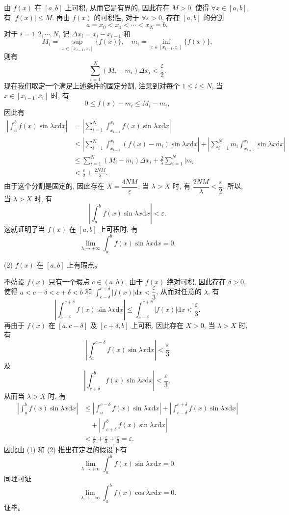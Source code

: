 \documentclass[UTF8, 12pt, fontset=fandol, oneside]{ctexart}
\begin{document}
由 $f(x)$ 在 $[a,b]$ 上可积, 从而它是有界的, 因此存在 $M>0$, 使得 $\forall x\in[a,b]$, 有 $|f(x)|\leqslant M$. 再由 $f(x)$ 的可积性, 对于 $\forall\varepsilon>0$, 存在 $[a,b]$ 的分割
\[
  a=x_0<x_1<\cdots<x_N=b,
\]
对于 $i=1,2,\cdots,N$, 记 $\Delta x_i=x_i-x_{i-1}$ 和
\[
  M_i=\sup_{x\in[x_{i-1},x_i]}\{f(x)\},\quad
  m_i=\inf_{x\in[x_{i-1},x_i]}\{f(x)\},
\]
则有
\[
  \sum_{i=1}^N(M_i-m_i)\Delta x_i<\frac{\varepsilon}{2}.
\]
现在我们取定一个满足上述条件的固定分割, 注意到对每个 $1\leqslant i\leqslant N$, 当 $x\in[x_{i-1},x_i]$ 时, 有
\[
  0\leqslant f(x)-m_i\leqslant M_i-m_i,
\]
因此有
\[
\begin{aligned}
  \left|\int_a^b f(x)\sin\lambda x\mathrm dx\right|
  &=\left|\sum_{i=1}^N\int_{x_{i-1}}^{x_i}f(x)\sin\lambda x\mathrm dx\right|\\
  &\leqslant\left|\sum_{i=1}^N\int_{x_{i-1}}^{x_i}(f(x)-m_i)\sin\lambda x\mathrm dx\right|
    +\left|\sum_{i=1}^N m_i\int_{x_{i-1}}^{x_i}\sin\lambda x\mathrm dx\right|\\
  &\leqslant\sum_{i=1}^N(M_i-m_i)\Delta x_i+\frac2\lambda\sum_{i=1}^N|m_i|\\
  &<\frac{\varepsilon}{2}+\frac{2NM}{\lambda}.
\end{aligned}
\]
由于这个分割是固定的, 因此存在 $X=\dfrac{4NM}{\varepsilon}$, 当 $\lambda>X$ 时, 有 $\dfrac{2NM}{\lambda}<\dfrac{\varepsilon}{2}$. 所以, 当 $\lambda>X$ 时, 有
\[
  \left|\int_a^b f(x)\sin\lambda x\mathrm dx\right|<\varepsilon.
\]
这就证明了当 $f(x)$ 在 $[a,b]$ 上可积时, 有
\[
  \lim_{\lambda\to+\infty}\int_a^b f(x)\sin\lambda x\mathrm dx=0.
\]

(2) $f(x)$ 在 $[a,b]$ 上有瑕点。

不妨设 $f(x)$ 只有一个瑕点 $c\in(a,b)$. 由于 $f(x)$ 绝对可积, 因此存在 $\delta>0$, 使得 $a<c-\delta<c+\delta<b$ 和 $\int_{c-\delta}^{c+\delta}|f(x)|\mathrm dx<\dfrac{\varepsilon}{3}$, 从而对任意的 $\lambda$, 有
\[
  \left|\int_{c-\delta}^{c+\delta}f(x)\sin\lambda x\mathrm dx\right|
  \leqslant\int_{c-\delta}^{c+\delta}|f(x)|\mathrm dx<\frac{\varepsilon}{3}.
\]
再由于 $f(x)$ 在 $[a,c-\delta]$ 及 $[c+\delta,b]$ 上可积, 因此存在 $X>0$, 当 $\lambda>X$ 时, 有
\[
  \left|\int_a^{c-\delta}f(x)\sin\lambda x\mathrm dx\right|<\frac{\varepsilon}{3}
\]
及
\[
  \left|\int_{c+\delta}^b f(x)\sin\lambda x\mathrm dx\right|<\frac{\varepsilon}{3},
\]
从而当 $\lambda>X$ 时, 有
\[
\begin{aligned}
  \left|\int_a^b f(x)\sin\lambda x\mathrm dx\right|
  &\leqslant\left|\int_a^{c-\delta}f(x)\sin\lambda x\mathrm dx\right|
    +\left|\int_{c-\delta}^{c+\delta}f(x)\sin\lambda x\mathrm dx\right|\\
  &\quad+\left|\int_{c+\delta}^b f(x)\sin\lambda x\mathrm dx\right|\\
  &<\frac{\varepsilon}{3}+\frac{\varepsilon}{3}+\frac{\varepsilon}{3}=\varepsilon.
\end{aligned}
\]
因此由 (1) 和 (2) 推出在定理的假设下有
\[
  \lim_{\lambda\to+\infty}\int_a^b f(x)\sin\lambda x\mathrm dx=0.
\]
同理可证
\[
  \lim_{\lambda\to+\infty}\int_a^b f(x)\cos\lambda x\mathrm dx=0.
\]
证毕。
\end{document}
